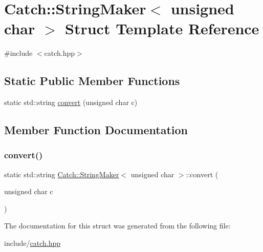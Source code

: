 \hypertarget{struct_catch_1_1_string_maker_3_01unsigned_01char_01_4}{}\section{Catch\+::String\+Maker$<$ unsigned char $>$ Struct Template Reference}
\label{struct_catch_1_1_string_maker_3_01unsigned_01char_01_4}


{\ttfamily \#include $<$catch.\+hpp$>$}

\subsection*{Static Public Member Functions}
\begin{DoxyCompactItemize}
\item 
static std\+::string \mbox{\hyperlink{struct_catch_1_1_string_maker_3_01unsigned_01char_01_4_a7cddb1df26275b9a8e631466eb122f59}{convert}} (unsigned char c)
\end{DoxyCompactItemize}


\subsection{Member Function Documentation}
\mbox{\label{struct_catch_1_1_string_maker_3_01unsigned_01char_01_4_a7cddb1df26275b9a8e631466eb122f59}} 
\subsubsection{\texorpdfstring{convert()}{convert()}}
{\footnotesize\ttfamily static std\+::string \mbox{\hyperlink{struct_catch_1_1_string_maker}{Catch\+::\+String\+Maker}}$<$ unsigned char $>$\+::convert (\begin{DoxyParamCaption}\item[{unsigned char}]{c }\end{DoxyParamCaption})\hspace{0.3cm}{\ttfamily [static]}}



The documentation for this struct was generated from the following file\+:\begin{DoxyCompactItemize}
\item 
include/\mbox{\hyperlink{catch_8hpp}{catch.\+hpp}}\end{DoxyCompactItemize}
